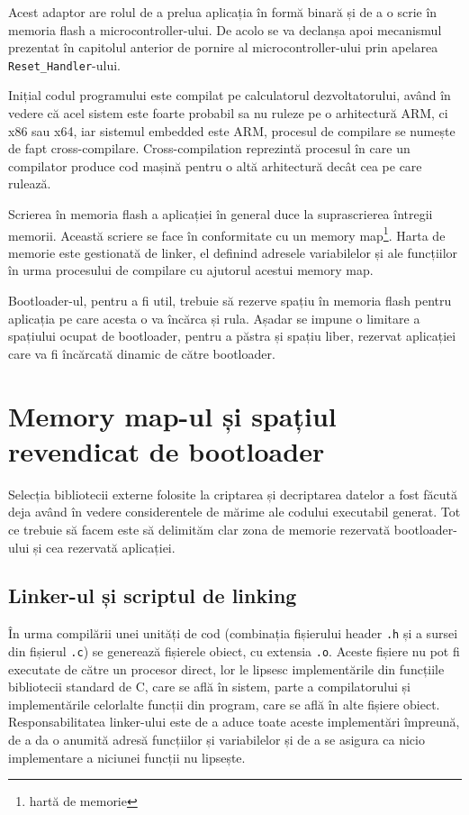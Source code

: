\documentclass[12pt,a4paper,titlepage]{report}
\begin{document}
Acest adaptor are rolul de a prelua aplicația în formă binară și de a o scrie în memoria flash a microcontroller-ului. De acolo se va declanșa apoi mecanismul prezentat în capitolul anterior de pornire al microcontroller-ului prin apelarea \texttt{Reset\_Handler}-ului.

Inițial codul programului este compilat pe calculatorul dezvoltatorului, având în vedere că acel sistem este foarte probabil sa nu ruleze pe o arhitectură ARM, ci x86 sau x64, iar sistemul embedded este ARM, procesul de compilare se numește de fapt cross-compilare. Cross-compilation reprezintă procesul în care un compilator produce cod mașină pentru o altă arhitectură decât cea pe care rulează. \cite{crossCompilation}

Scrierea în memoria flash a aplicației în general duce la suprascrierea întregii memorii. Această scriere se face în conformitate cu un memory map\footnote{hartă de memorie}. Harta de memorie este gestionată de linker, el definind adresele variabilelor și ale funcțiilor în urma procesului de compilare cu ajutorul acestui memory map.

Bootloader-ul, pentru a fi util, trebuie să rezerve spațiu în memoria flash pentru aplicația pe care acesta o va încărca și rula. Așadar se impune o limitare a spațiului ocupat de bootloader, pentru a păstra și spațiu liber, rezervat aplicației care va fi încărcată dinamic de către bootloader.

\section{Memory map-ul și spațiul revendicat de bootloader}

Selecția bibliotecii externe folosite la criptarea și decriptarea datelor a fost făcută deja având în vedere considerentele de mărime ale codului executabil generat. Tot ce trebuie să facem este să delimităm clar zona de memorie rezervată bootloader-ului și cea rezervată aplicației.

\subsection{Linker-ul și scriptul de linking}

În urma compilării unei unități de cod (combinația fișierului header \texttt{.h} și a sursei din fișierul \texttt{.c}) se generează fișierele obiect, cu extensia \texttt{.o}. Aceste fișiere nu pot fi executate de către un procesor direct, lor le lipsesc implementările din funcțiile bibliotecii standard de C, care se află în sistem, parte a compilatorului și implementările celorlalte funcții din program, care se află în alte fișiere obiect. Responsabilitatea linker-ului este de a aduce toate aceste implementări împreună, de a da o anumită adresă funcțiilor și variabilelor și de a se asigura ca nicio implementare a niciunei funcții nu lipsește.
\end{document}
